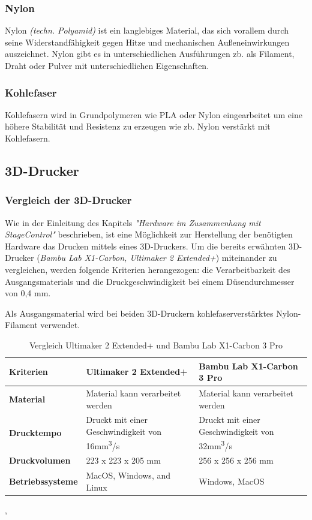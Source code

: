\subsubsection{Nylon}
Nylon \emph{(techn. Polyamid)} ist ein langlebiges Material, das sich vorallem durch seine Widerstandfähigkeit gegen Hitze und mechanischen Außeneinwirkungen auszeichnet. Nylon gibt es in unterschiedlichen Ausführungen zb. als Filament, Draht oder Pulver mit unterschiedlichen Eigenschaften. \cite{Nylon}
\subsubsection{Kohlefaser}
Kohlefasern wird in Grundpolymeren wie PLA oder Nylon eingearbeitet um eine höhere Stabilität und Resistenz zu erzeugen wie zb. Nylon verstärkt mit Kohlefasern.\\
 \cite{Kohlefasern}


\subsection{3D-Drucker}

\subsubsection{Vergleich der 3D-Drucker}
Wie in der Einleitung des Kapitels \emph{"Hardware im Zusammenhang mit StageControl"} beschrieben, ist eine Möglichkeit zur Herstellung der benötigten Hardware das Drucken mittels eines 3D-Druckers. Um die bereits erwähnten 3D-Drucker (\emph{Bambu Lab X1-Carbon, Ultimaker 2 Extended+}) miteinander zu vergleichen, werden folgende Kriterien herangezogen: die Verarbeitbarkeit des Ausgangsmaterials und die Druckgeschwindigkeit bei einem Düsendurchmesser von 0,4 mm. 

Als Ausgangsmaterial wird bei beiden 3D-Druckern kohlefaserverstärktes Nylon-Filament verwendet.

\begin{table} [H]
	\begin{tabular}{ |p{2.7cm} |p{4.8cm}|p{4.8cm}| }
		\hline
		 \textbf{Kriterien} & \textbf{Ultimaker 2 Extended+}& \textbf{Bambu Lab X1-Carbon 3 Pro}\\
		\hline
		\textbf{Material} & Material kann verarbeitet werden & Material kann verarbeitet werden   \\ 
		\hline
		\textbf{Drucktempo} & Druckt mit einer Geschwindigkeit von 16mm\textsuperscript{3}/s &
		 Druckt mit einer Geschwindigkeit von 32mm\textsuperscript{3}/s   \\  
		\hline
		\textbf{Druckvolumen} & 223 x 223 x 205 mm & 256 x 256 x 256 mm \\
		\hline
		\textbf{Betriebssysteme} & MacOS, Windows, and Linux & Windows, MacOS \\
		\hline
	\end{tabular}
	\caption{Vergleich  Ultimaker 2 Extended+ und Bambu Lab X1-Carbon 3 Pro}
\end{table}
\cite{BambuLabX1-Carbon3DPrinter-Specifications}, \cite{Ultimaker2Extended+-Specification}


